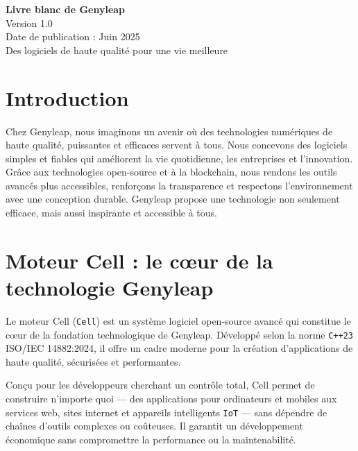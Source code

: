 \documentclass[a4paper,12pt,openany]{book}
\begin{document}
\begin{titlepage}
    \begin{center}
        \vspace*{1.5cm}
        {\Huge \textbf{Livre blanc de Genyleap}} \\
        \vspace{0.5cm}
        {\Large Version 1.0} \\
        \vspace{0.5cm}
        {\large Date de publication : Juin 2025} \\
        \vspace{1.5cm}
        {\large Des logiciels de haute qualité pour une vie meilleure} \\
    \end{center}
    \vfill
\end{titlepage}

\chapter{Introduction}
Chez Genyleap, nous imaginons un avenir où des technologies numériques de haute qualité, puissantes et efficaces servent à tous. Nous concevons des logiciels simples et fiables qui améliorent la vie quotidienne, les entreprises et l'innovation. Grâce aux technologies open-source et à la blockchain, nous rendons les outils avancés plus accessibles, renforçons la transparence et respectons l'environnement avec une conception durable. Genyleap propose une technologie non seulement efficace, mais aussi inspirante et accessible à tous.

\chapter{Moteur Cell : le cœur de la technologie Genyleap}

Le moteur Cell (\texttt{Cell}) est un système logiciel open-source avancé qui constitue le cœur de la fondation technologique de Genyleap. Développé selon la norme \texttt{C++23} ISO/IEC 14882:2024, il offre un cadre moderne pour la création d'applications de haute qualité, sécurisées et performantes.

Conçu pour les développeurs cherchant un contrôle total, Cell permet de construire n'importe quoi — des applications pour ordinateurs et mobiles aux services web, sites internet et appareils intelligents \texttt{IoT} — sans dépendre de chaînes d'outils complexes ou coûteuses. Il garantit un développement économique sans compromettre la performance ou la maintenabilité.
\end{document}
